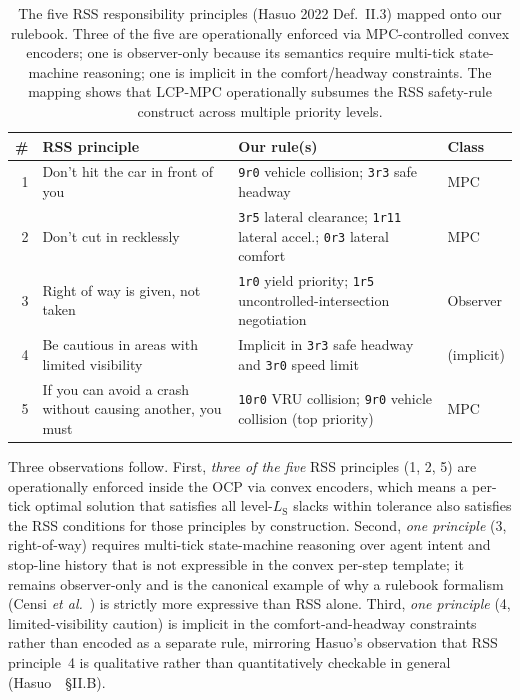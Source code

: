 \begin{table}[t]
    \centering
    \caption{The five RSS responsibility principles (Hasuo 2022 Def.~II.3) mapped onto our rulebook. Three of the five are operationally enforced via MPC-controlled convex encoders; one is observer-only because its semantics require multi-tick state-machine reasoning; one is implicit in the comfort/headway constraints. The mapping shows that LCP-MPC operationally subsumes the RSS safety-rule construct across multiple priority levels.}
    \label{tab:rss_principle_mapping}
    \footnotesize
    \begin{tabularx}{\linewidth}{@{}r >{\raggedright\arraybackslash}p{2.0cm} X l@{}}
        \toprule
        \# & RSS principle & Our rule(s) & Class \\
        \midrule
        1 & Don't hit the car in front of you
          & \texttt{9r0} vehicle collision; \texttt{3r3} safe headway
          & MPC \\
        2 & Don't cut in recklessly
          & \texttt{3r5} lateral clearance; \texttt{1r11} lateral accel.;
            \texttt{0r3} lateral comfort
          & MPC \\
        3 & Right of way is given, not taken
          & \texttt{1r0} yield priority; \texttt{1r5} uncontrolled-intersection negotiation
          & Observer \\
        4 & Be cautious in areas with limited visibility
          & Implicit in \texttt{3r3} safe headway and \texttt{3r0} speed limit
          & (implicit) \\
        5 & If you can avoid a crash without causing another, you must
          & \texttt{10r0} VRU collision; \texttt{9r0} vehicle collision (top priority)
          & MPC \\
        \bottomrule
    \end{tabularx}
\end{table}

Three observations follow. First, \emph{three of the five} RSS principles (1, 2, 5) are operationally enforced inside the OCP via convex encoders, which means a per-tick optimal solution that satisfies all level-$L_{\mathrm{S}}$ slacks within tolerance also satisfies the RSS conditions for those principles by construction. Second, \emph{one principle} (3, right-of-way) requires multi-tick state-machine reasoning over agent intent and stop-line history that is not expressible in the convex per-step template; it remains observer-only and is the canonical example of why a rulebook formalism (Censi \emph{et al.}~\cite{censi2019liability}) is strictly more expressive than RSS alone. Third, \emph{one principle} (4, limited-visibility caution) is implicit in the comfort-and-headway constraints rather than encoded as a separate rule, mirroring Hasuo's observation that RSS principle~4 is qualitative rather than quantitatively checkable in general (Hasuo~\cite{hasuo2022rss}~\S{}II.B).
